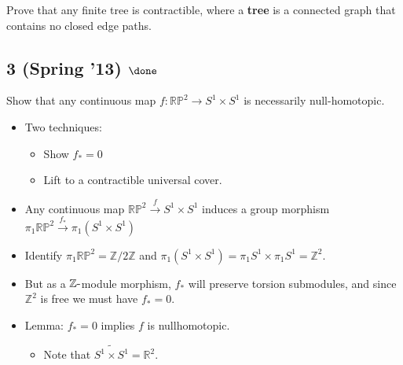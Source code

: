 Prove that any finite tree is contractible, where a \textbf{tree} is a
connected graph that contains no closed edge paths.

\hypertarget{spring-13-done}{%
\subsection{\texorpdfstring{3 (Spring '13)
\(\done\)}{3 (Spring '13) \textbackslash done}}\label{spring-13-done}}

Show that any continuous map \(f : {\mathbb{RP}}^2 \to S^1 \times S^1\)
is necessarily null-homotopic.

\begin{solution}

\hfill

\begin{concept}

\hfill

\begin{itemize}
\tightlist
\item
  Two techniques:

  \begin{itemize}
  \tightlist
  \item
    Show \(f_* = 0\)
  \item
    Lift to a contractible universal cover.
  \end{itemize}
\end{itemize}

\end{concept}

\begin{itemize}
\item
  Any continuous map \({\mathbb{RP}}^2 \xrightarrow{f} S^1\times S^1\)
  induces a group morphism
  \(\pi_1 {\mathbb{RP}}^2 \xrightarrow{f_*} \pi_1(S^1\times S^1)\)
\item
  Identify \(\pi_1 {\mathbb{RP}}^2 = {\mathbb{Z}}/2{\mathbb{Z}}\) and
  \(\pi_1(S^1\times S^1) = \pi_1 S^1 \times\pi_1 S^1 = {\mathbb{Z}}^2\).
\item
  But as a \({\mathbb{Z}}{\hbox{-}}\)module morphism, \(f_*\) will
  preserve torsion submodules, and since \({\mathbb{Z}}^2\) is free we
  must have \(f_* = 0\).
\item
  Lemma: \(f_* = 0\) implies \(f\) is nullhomotopic.

  \begin{itemize}
  \tightlist
  \item
    Note that \(\widetilde{S^1\times S^1} = {\mathbb{R}}^2\).
  \end{itemize}
\end{itemize}

\end{solution}

